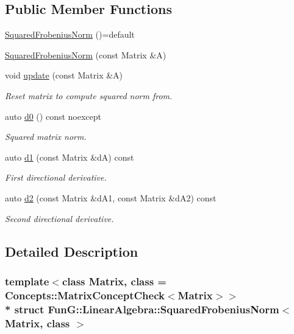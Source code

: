 \subsection*{Public Member Functions}
\begin{DoxyCompactItemize}
\item 
\hyperlink{structFunG_1_1LinearAlgebra_1_1SquaredFrobeniusNorm_ae9dfaea546dd55106ab886a10a255792}{Squared\+Frobenius\+Norm} ()=default
\item 
\hyperlink{structFunG_1_1LinearAlgebra_1_1SquaredFrobeniusNorm_af33cdb4a7282ceb03b707ff7fa85ebe4}{Squared\+Frobenius\+Norm} (const Matrix \&A)
\item 
void \hyperlink{structFunG_1_1LinearAlgebra_1_1SquaredFrobeniusNorm_ac4c6dbd6c3beb28d1f77b3e1367d70b6}{update} (const Matrix \&A)
\begin{DoxyCompactList}\small\item\em Reset matrix to compute squared norm from. \end{DoxyCompactList}\item 
auto \hyperlink{structFunG_1_1LinearAlgebra_1_1SquaredFrobeniusNorm_af0315a30be696111d572313dc16ef0f5}{d0} () const noexcept
\begin{DoxyCompactList}\small\item\em Squared matrix norm. \end{DoxyCompactList}\item 
auto \hyperlink{structFunG_1_1LinearAlgebra_1_1SquaredFrobeniusNorm_aba96a8b0e500268388d8dc2751188673}{d1} (const Matrix \&dA) const 
\begin{DoxyCompactList}\small\item\em First directional derivative. \end{DoxyCompactList}\item 
auto \hyperlink{structFunG_1_1LinearAlgebra_1_1SquaredFrobeniusNorm_a052a1615f0a6f2a0e66dba2370f7e255}{d2} (const Matrix \&d\+A1, const Matrix \&d\+A2) const 
\begin{DoxyCompactList}\small\item\em Second directional derivative. \end{DoxyCompactList}\end{DoxyCompactItemize}


\subsection{Detailed Description}
\subsubsection*{template$<$class Matrix, class = Concepts\+::\+Matrix\+Concept\+Check$<$\+Matrix$>$$>$\\*
struct Fun\+G\+::\+Linear\+Algebra\+::\+Squared\+Frobenius\+Norm$<$ Matrix, class $>$}

